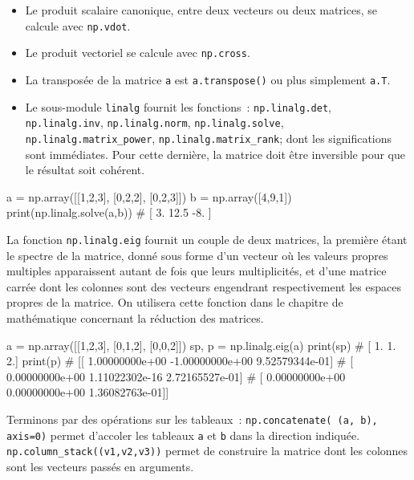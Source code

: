 \documentclass[10pt,fleqn]{article} %
\begin{document}
\begin{itemize}
\item Le produit scalaire canonique, entre deux vecteurs ou deux matrices,
se calcule avec \texttt{np.vdot}.
\item Le produit vectoriel se calcule avec \texttt{np.cross}.
\item La transposée de la matrice \texttt{a} est \texttt{a.transpose()} ou
plus simplement \texttt{a.T}.
\item Le sous-module \texttt{linalg} fournit les fonctions~:
  \texttt{np.linalg.det}, \texttt{np.linalg.inv},
  \texttt{np.linalg.norm}, \texttt{np.linalg.solve},\\
  \texttt{np.linalg.matrix\_power},
  \texttt{np.linalg.matrix\_rank};
dont les
significations sont immédiates. Pour cette dernière, la matrice doit
être inversible pour que le résultat soit cohérent.
\end{itemize}
\begin{python}
a = np.array([[1,2,3],
              [0,2,2],
              [0,2,3]])
b = np.array([4,9,1])
print(np.linalg.solve(a,b))
# [  3.   12.5  -8. ]  
\end{python}

La fonction \texttt{np.linalg.eig} fournit un couple de deux matrices,
la première étant le spectre de la matrice, donné sous forme d'un
vecteur où les valeurs propres multiples apparaissent autant de fois
que leurs multiplicités, et d'une matrice carrée dont les colonnes
sont des vecteurs engendrant respectivement les espaces propres de la
matrice. On utilisera cette fonction dans le chapitre de mathématique
concernant la réduction des matrices.

\begin{multicols}{2}
\begin{python}
a = np.array([[1,2,3],
              [0,1,2],
              [0,0,2]])
sp, p = np.linalg.eig(a)
print(sp)
# [ 1.  1.  2.]
print(p)
# [[  1.00000000e+00  -1.00000000e+00   9.52579344e-01]
#  [  0.00000000e+00   1.11022302e-16   2.72165527e-01]
#  [  0.00000000e+00   0.00000000e+00   1.36082763e-01]]  
\end{python}
\end{multicols}

Terminons par des opérations sur les tableaux~:
\texttt{np.concatenate( (a, b), axis=0)} permet d'accoler les tableaux
\texttt{a} et \texttt{b} dans la direction
indiquée. \texttt{np.column\_stack((v1,v2,v3))} permet de construire
la matrice dont les colonnes sont les vecteurs passés en arguments.
\end{document}
